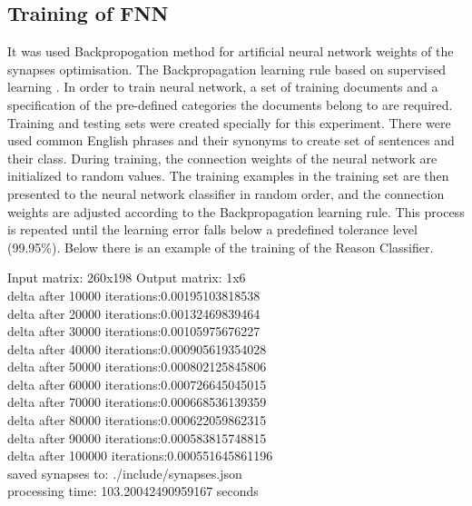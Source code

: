 \documentclass{llncs}
\begin{document}
    \subsection{Training of FNN}
    It was used Backpropogation method for artificial neural network weights of the synapses optimisation.
    The Backpropagation learning rule based on supervised learning \cite{14}.
    In order to train neural network, a set of training documents and a specification of the pre-defined categories the documents belong to are required.
    Training and testing sets were created specially for this experiment.
    There were used common English phrases and their synonyms to create set of sentences and their class.
    During training, the connection weights of the neural network are initialized to random values.
    The training examples in the training set are then presented to the neural network classifier in random order, and the connection weights are adjusted according to the Backpropagation learning rule.
    This process is repeated until the learning error falls below a predefined tolerance level (99.95\%).
    Below there is an example of the training of the Reason Classifier.
    \begin{example}
        Input matrix: 260x198 Output matrix: 1x6\\
        delta after 10000 iterations:0.00195103818538\\
        delta after 20000 iterations:0.00132469839464\\
        delta after 30000 iterations:0.00105975676227\\
        delta after 40000 iterations:0.000905619354028\\
        delta after 50000 iterations:0.000802125845806\\
        delta after 60000 iterations:0.000726645045015\\
        delta after 70000 iterations:0.000668536139359\\
        delta after 80000 iterations:0.000622059862315\\
        delta after 90000 iterations:0.000583815748815\\
        delta after 100000 iterations:0.000551645861196\\
        saved synapses to: ./include/synapses.json\\
        processing time: 103.20042490959167 seconds\\
    \end{example}
\end{document}
